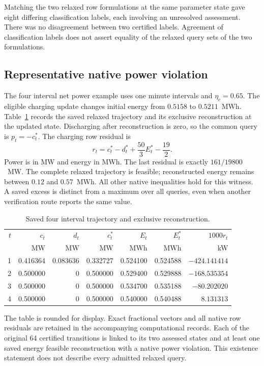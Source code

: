Matching the two relaxed row formulations at the same parameter state gave
eight differing classification labels, each involving an unresolved
assessment. There was no disagreement between two certified labels.
Agreement of classification labels does not assert equality of the relaxed
query sets of the two formulations.


\subsection{Representative native power violation}
The four interval net power example uses one minute intervals and
$\eta_c=0.65$. The eligible charging update changes initial energy from
$0.5158$ to $0.5211$~MWh. Table~\ref{tab:transition_vector} records the
saved relaxed trajectory and its exclusive reconstruction at the updated
state. Discharging after reconstruction is zero, so the common query is
$p_t=-c_t^*$. The charging row residual is
\begin{equation}
r_t=c_t^*-d_t^*+\frac{50}{3}E_t^*-\frac{19}{2} .\label{eq:witness_residual}
\end{equation}
Power is in MW and energy in MWh. The last residual is exactly
$161/19800$~MW. The complete relaxed trajectory is feasible; reconstructed
energy remains between $0.12$ and $0.57$~MWh. All other native inequalities
hold for this witness. A saved excess is distinct from a maximum over all
queries, even when another verification route reports the same value.

\begin{table}[htbp]
\caption{Saved four interval trajectory and exclusive reconstruction.}\label{tab:transition_vector}
\begin{tabular}{@{}rrrrrrr@{}}\toprule
$t$ & $c_t$ & $d_t$ & $c_t^*$ & $E_t$ & $E_t^*$ & $1000r_t$\\
 & MW & MW & MW & MWh & MWh & kW\\\midrule
1&0.416364&0.083636&0.332727&0.524100&0.524588&$-424.141414$\\
2&0.500000&0&0.500000&0.529400&0.529888&$-168.535354$\\
3&0.500000&0&0.500000&0.534700&0.535188&$-80.202020$\\
4&0.500000&0&0.500000&0.540000&0.540488&$8.131313$\\
\bottomrule\end{tabular}
\end{table}

The table is rounded for display. Exact fractional vectors and all native
row residuals are retained in the accompanying computational records.
Each of the original 64 certified transitions is linked to its two assessed states and at least
one saved energy feasible reconstruction with a native power violation.
This existence statement does not describe every admitted relaxed query.

